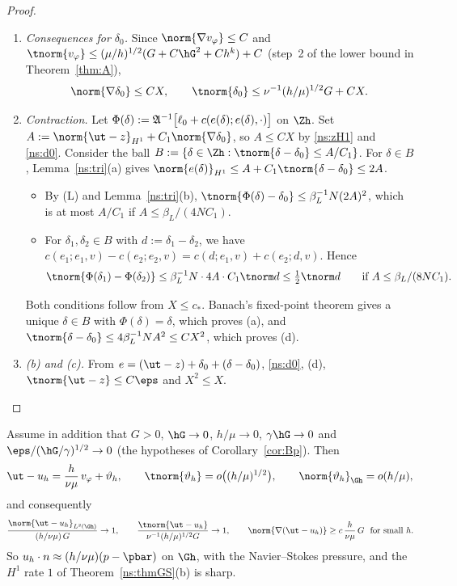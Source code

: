 \begin{proof}
\begin{enumerate}
\[
\tnorm r\le C\beta_L^{-1}\bigl(h/\mu+\hG^{3/2}+\eps\bigr).
\]
\item \emph{Consequences for $\delta_0$.} Since $\norm{\nabla v_\varphi}\le C$ and $\tnorm{v_\varphi}\le(\mu/h)^{1/2}(G+C\hG^2+Ch^k)+C$ (step~2 of the lower bound in Theorem~\ref{thm:A}),
\begin{equation}\label{ns:d0}
\norm{\nabla\delta_0}\le CX,\qquad \tnorm{\delta_0}\le\nu^{-1}(h/\mu)^{1/2}G+CX .
\end{equation}
\item \emph{Contraction.} Let $\Phi(\delta):=\mathfrak A^{-1}\bigl[\ell_0+c(e(\delta);e(\delta),\cdot)\bigr]$ on $\Zh$. Set $A:=\norm{\ut-z}_{H^1}+C_1\norm{\nabla\delta_0}$, so $A\le CX$ by \eqref{ns:zH1} and \eqref{ns:d0}. Consider the ball $B:=\{\delta\in\Zh:\tnorm{\delta-\delta_0}\le A/C_1\}$. For $\delta\in B$, Lemma~\ref{ns:tri}(a) gives $\norm{e(\delta)}_{H^1}\le A+C_1\tnorm{\delta-\delta_0}\le2A$.
\begin{itemize}
\item By (L) and Lemma~\ref{ns:tri}(b), $\tnorm{\Phi(\delta)-\delta_0}\le\beta_L^{-1}N(2A)^2$, which is at most $A/C_1$ if $A\le\beta_L/(4NC_1)$.
\item For $\delta_1,\delta_2\in B$ with $d:=\delta_1-\delta_2$, we have $c(e_1;e_1,v)-c(e_2;e_2,v)=c(d;e_1,v)+c(e_2;d,v)$. Hence
\[
\tnorm{\Phi(\delta_1)-\Phi(\delta_2)}\le\beta_L^{-1}N\cdot4A\cdot C_1\tnorm d\le\tfrac12\tnorm d\qquad\text{if }A\le\beta_L/(8NC_1).
\]
\end{itemize}
Both conditions follow from $X\le c_\ast$. Banach's fixed-point theorem gives a unique $\delta\in B$ with $\Phi(\delta)=\delta$, which proves (a), and $\tnorm{\delta-\delta_0}\le4\beta_L^{-1}NA^2\le CX^2$, which proves (d).
\item \emph{(b) and (c).} From $e=(\ut-z)+\delta_0+(\delta-\delta_0)$, \eqref{ns:d0}, (d), $\tnorm{\ut-z}\le C\eps$ and $X^2\le X$.\qedhere
\end{enumerate}
\end{proof}

\begin{corollary}\label{ns:Bp}
Assume in addition that $G>0$, $\hG\to0$, $h/\mu\to0$, $\gamma\hG\to0$ and $\eps/(\hG/\gamma)^{1/2}\to0$ (the hypotheses of Corollary~\ref{cor:Bp}). Then
\[
\ut-u_h=\frac{h}{\nu\mu}\,v_\varphi+\vartheta_h,\qquad \tnorm{\vartheta_h}=o\bigl((h/\mu)^{1/2}\bigr),\qquad\norm{\vartheta_h}_{\Gh}=o(h/\mu),
\]
and consequently
\[
\frac{\norm{\ut-u_h}_{L^2(\Gh)}}{(h/\nu\mu)\,G}\to1,\qquad
\frac{\tnorm{\ut-u_h}}{\nu^{-1}(h/\mu)^{1/2}G}\to1,\qquad
\norm{\nabla(\ut-u_h)}\ge c\,\frac{h}{\nu\mu}\,G\ \ \text{for small }h .
\]
So $u_h\cdot n\approx(h/\nu\mu)(p-\pbar)$ on $\Gh$, with the Navier--Stokes pressure, and the $H^1$ rate $1$ of Theorem~\ref{ns:thmGS}(b) is sharp.
\end{corollary}

